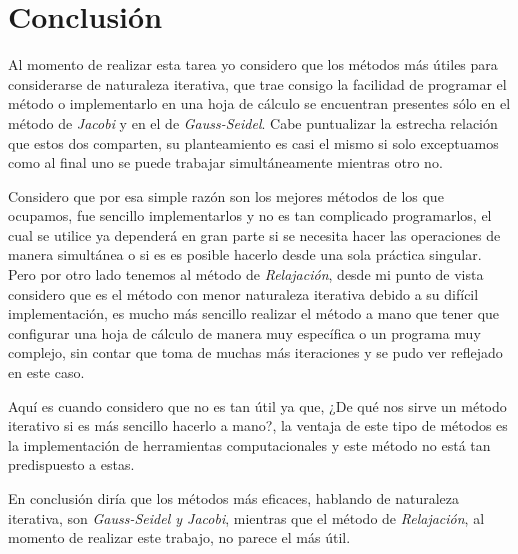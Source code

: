 \documentclass{article}
\begin{document}
\section{Conclusión}
Al momento de realizar esta tarea yo considero que los métodos más útiles para considerarse de naturaleza iterativa, que
trae consigo la facilidad de programar el método o implementarlo en una hoja de cálculo se encuentran presentes sólo en el
método de \emph{Jacobi} y en el de \emph{Gauss-Seidel}. Cabe puntualizar la estrecha relación que estos dos comparten, su
planteamiento es casi el mismo si solo exceptuamos como al final uno se puede trabajar simultáneamente mientras otro no.


Considero que por esa simple razón son los mejores métodos de los que ocupamos, fue sencillo implementarlos y no es tan complicado
programarlos, el cual se utilice ya dependerá en gran parte si se necesita hacer las operaciones de manera simultánea o si es
es posible hacerlo desde una sola práctica singular. Pero por otro lado tenemos al método de \emph{Relajación}, desde mi punto de
vista considero que es el método con menor naturaleza iterativa debido a su difícil implementación, es mucho más sencillo realizar el
método a mano que tener que configurar una hoja de cálculo de manera muy específica o un programa muy complejo, sin contar que toma de
muchas más iteraciones y se pudo ver reflejado en este caso.


Aquí es cuando considero que no es tan útil ya que, ¿De qué nos sirve un método iterativo si es más sencillo hacerlo a mano?, la
ventaja de este tipo de métodos es la implementación de herramientas computacionales y este método no está tan predispuesto a estas.


En conclusión diría que los métodos más eficaces, hablando de naturaleza iterativa, son \emph{Gauss-Seidel y Jacobi}, mientras
que el método de \emph{Relajación}, al momento de realizar este trabajo, no parece el más útil.
\end{document}
